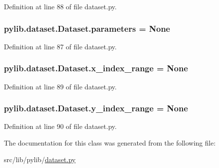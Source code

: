 Definition at line 88 of file dataset.\+py.

\subsubsection[{\texorpdfstring{parameters}{parameters}}]{\setlength{\rightskip}{0pt plus 5cm}pylib.\+dataset.\+Dataset.\+parameters = None\hspace{0.3cm}{\ttfamily [static]}}\hypertarget{classpylib_1_1dataset_1_1Dataset_a204b597a0941f5c01cebc76df738a8b0}{}\label{classpylib_1_1dataset_1_1Dataset_a204b597a0941f5c01cebc76df738a8b0}


Definition at line 87 of file dataset.\+py.

\subsubsection[{\texorpdfstring{x\+\_\+index\+\_\+range}{x_index_range}}]{\setlength{\rightskip}{0pt plus 5cm}pylib.\+dataset.\+Dataset.\+x\+\_\+index\+\_\+range = None\hspace{0.3cm}{\ttfamily [static]}}\hypertarget{classpylib_1_1dataset_1_1Dataset_a60bba281477afcad716427a8b0649492}{}\label{classpylib_1_1dataset_1_1Dataset_a60bba281477afcad716427a8b0649492}


Definition at line 89 of file dataset.\+py.

\subsubsection[{\texorpdfstring{y\+\_\+index\+\_\+range}{y_index_range}}]{\setlength{\rightskip}{0pt plus 5cm}pylib.\+dataset.\+Dataset.\+y\+\_\+index\+\_\+range = None\hspace{0.3cm}{\ttfamily [static]}}\hypertarget{classpylib_1_1dataset_1_1Dataset_a307b60438a0779b7e96d971a0d5c4be6}{}\label{classpylib_1_1dataset_1_1Dataset_a307b60438a0779b7e96d971a0d5c4be6}


Definition at line 90 of file dataset.\+py.



The documentation for this class was generated from the following file\+:\begin{DoxyCompactItemize}
\item 
src/lib/pylib/\hyperlink{dataset_8py}{dataset.\+py}\end{DoxyCompactItemize}
